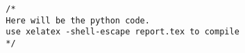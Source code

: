     

\begin{verbatim}
  /*
  Here will be the python code.
  use xelatex -shell-escape report.tex to compile 
  */
\end{verbatim}